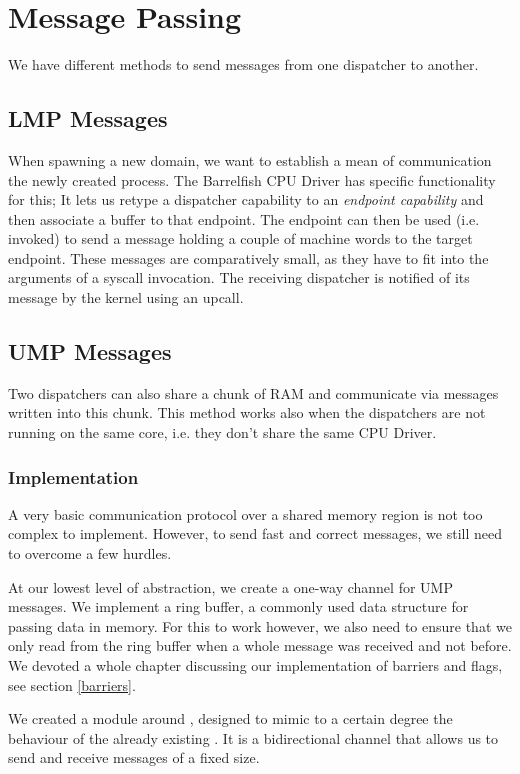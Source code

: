 \section{Message Passing}\label{message_passing}

We have different methods to send messages from one dispatcher to another.

\subsection{LMP Messages}
When spawning a new domain, we want to establish a mean of communication the newly created process. The Barrelfish CPU Driver has specific functionality for this; It lets us retype a dispatcher capability to an \emph{endpoint capability} and then associate a buffer to that endpoint. The endpoint can then be used (i.e. invoked) to send a message holding a couple of machine words to the target endpoint.
These messages are comparatively small, as they have to fit into the arguments of a syscall invocation.
The receiving dispatcher is notified of its message by the kernel using an upcall.

\subsection{UMP Messages}
Two dispatchers can also share a chunk of RAM and communicate via messages written into this chunk.
This method works also when the dispatchers are not running on the same core, i.e. they don't share the same CPU Driver.

\subsubsection{Implementation}
A very basic communication protocol over a shared memory region is not too complex to implement.
However, to send fast and correct messages, we still need to overcome a few hurdles.

At our lowest level of abstraction, we create a one-way channel for UMP messages. We implement a ring buffer, a commonly used data structure for passing data in memory. For this to work however, we also need to ensure that we only read from the ring buffer when a whole message was received and not before. We devoted a whole chapter discussing our implementation of barriers and flags, see section \ref{barriers}.

We created a module around , designed to mimic to a certain degree the
behaviour of the already existing . It is a bidirectional channel
that allows us to send and receive messages of a fixed size.

